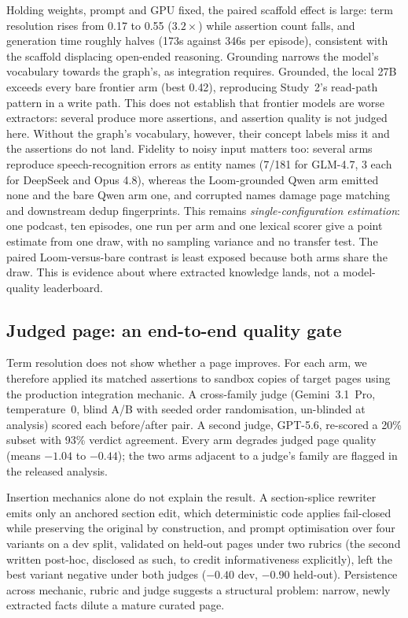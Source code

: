 \documentclass[10pt,twocolumn]{article}
\begin{document}
Holding weights, prompt and GPU fixed, the paired scaffold effect is large: term resolution rises
from 0.17 to 0.55 ($3.2\times$) while assertion count falls, and generation time roughly halves
(173s against 346s per episode), consistent with the scaffold displacing open-ended reasoning.
Grounding narrows the model's vocabulary towards the graph's, as integration requires. Grounded, the
local 27B exceeds every bare frontier arm (best 0.42), reproducing Study~2's read-path pattern in a
write path. This does not establish that frontier models are worse extractors: several produce more
assertions, and assertion quality is not judged here. Without the graph's vocabulary, however, their
concept labels miss it and the assertions do not land. Fidelity to noisy input matters too: several
arms reproduce speech-recognition errors as entity names (7/181 for GLM-4.7, 3 each for DeepSeek and
Opus 4.8), whereas the Loom-grounded Qwen arm emitted none and the bare Qwen arm one, and corrupted
names damage page matching and downstream dedup fingerprints. This remains
\emph{single-configuration estimation}: one podcast, ten episodes, one run per arm and one lexical
scorer give a point estimate from one draw, with no sampling variance and no transfer test. The
paired Loom-versus-bare contrast is least exposed because both arms share the draw. This is evidence
about where extracted knowledge lands, not a model-quality leaderboard.

\subsection{Judged page: an end-to-end quality gate}\label{sec:pagejudge}
Term resolution does not show whether a page improves. For each arm, we therefore applied its
matched assertions to sandbox copies of target pages using the production integration mechanic.
A cross-family judge (Gemini~3.1~Pro, temperature~0, blind A/B with seeded order randomisation,
un-blinded at analysis) scored each before/after pair. A second judge, GPT-5.6, re-scored a
20\% subset with 93\% verdict agreement. Every arm degrades judged page quality (means $-1.04$
to $-0.44$); the two arms adjacent to a judge's family are flagged in the released analysis.

Insertion mechanics alone do not explain the result. A section-splice rewriter emits only an
anchored section edit, which deterministic code applies fail-closed while preserving the original by
construction, and prompt optimisation over four variants on a dev split, validated on held-out pages
under two rubrics (the second written post-hoc, disclosed as such, to credit informativeness
explicitly), left the best variant negative under both judges ($-0.40$ dev, $-0.90$ held-out).
Persistence across mechanic, rubric and judge suggests a structural problem: narrow, newly extracted
facts dilute a mature curated page.
\end{document}
